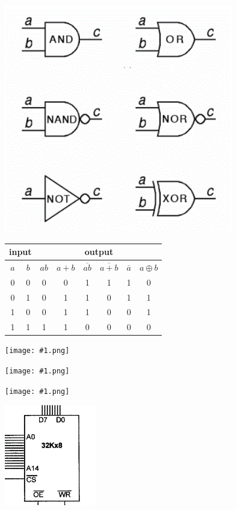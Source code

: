 \documentclass[10pt,a4paper]{article}
\def\img#1#2{\begin{tcolorbox}[title=#2]\texttt{[image: \#1.png]}\end{tcolorbox}}
\begin{document}
\begin{CJK}{UTF8}{song}
\begin{twocolumn}
\begin{tcolorbox}[title=逻辑门电路]
			\includegraphics[width=0.75\textwidth]{CMOS.png}
			\begin{tabular}{|c|c|c|c|c|c|c|c|}
				\hline
				\multicolumn{2}{|c|}{input} & \multicolumn{6}{c|}{output} \\
				\hline
				$ a $ & $ b $  & $ ab $ & $ a+b $ & $ \overline{ab} $ & $ \overline{a+b} $& $\overline{a}$ & $a\oplus b$ \\
				\hline
				0 & 0 & 0 & 0 & 1 & 1 & 1 & 0 \\
				\hline
				0 & 1 & 0 & 1 & 1 & 0 & 1 & 1 \\
				\hline
				1 & 0 & 0 & 1 & 1 & 0 & 0 & 1 \\
				\hline
				1 & 1 & 1 & 1 & 0 & 0 & 0 & 0 \\
				\hline
			\end{tabular}
		\end{tcolorbox}
		\begin{tcolorbox}[title=锁存器和数据传输器]
			\img{latch}{74LS373 D Latch}
			\img{dt}{Data Bus Transceiver}
		\end{tcolorbox}
		\img{buscycle}{8086/88 总线周期}
		\begin{tcolorbox}[title=RAM\&ROM]
			\centering
				\includegraphics[width=0.3\textwidth]{RAMC.png}

\end{tcolorbox}
\end{twocolumn}
\end{CJK}
\end{document}
